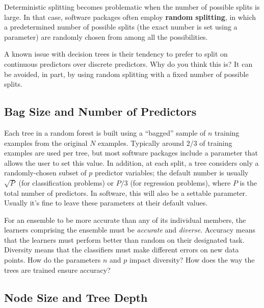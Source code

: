 \vspace{3mm}

Deterministic splitting becomes problematic when the number of possible splits is large. In that case, software packages often employ \textbf{random splitting}, in which a predetermined number of possible splits (the exact number is set using a parameter) are randomly chosen from among all the possibilities. 

\vspace{5mm}

\begin{question}{}
A known issue with decision trees is their tendency to prefer to split on continuous predictors over discrete predictors. Why do you think this is? It can be avoided, in part, by using random splitting with a fixed number of possible splits. 
\end{question}

\subsection{Bag Size and Number of Predictors}

Each tree in a random forest is built using a ``bagged'' sample of $n$ training examples from the original $N$ examples. Typically around $2/3$ of training examples are used per tree, but most software packages include a parameter that allows the user to set this value. In addition, at each split, a tree considers only a randomly-chosen subset of $p$ predictor variables; the default number is usually $\sqrt{P}$ (for classification problems) or $P/3$ (for regression problems), where $P$ is the total number of predictors. In software, this will also be a settable parameter. Usually it's fine to leave these parameters at their default values.

\vspace{5mm}

\begin{question}{}
For an ensemble to be more accurate than any of its individual members, the learners comprising the ensemble must be \emph{accurate} and \emph{diverse}. Accuracy means that the learners must perform better than random on their designated task. Diversity means that the classifiers must make different errors on new data points. How do the parameters $n$ and $p$ impact diversity? How does the way the trees are trained ensure accuracy?
\end{question} 

\subsection{Node Size and Tree Depth}

